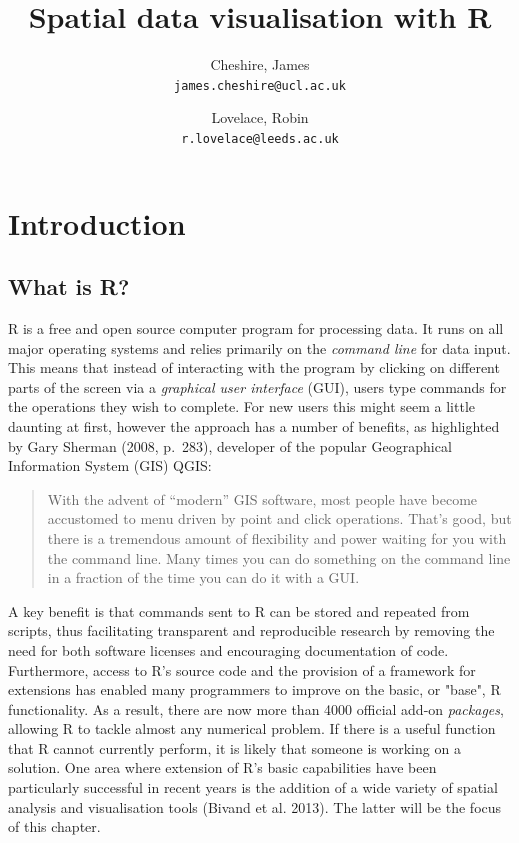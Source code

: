 \documentclass[]{article}
\begin{document}
\author{
Cheshire, James\\
\texttt{james.cheshire@ucl.ac.uk}
\and
Lovelace, Robin\\
\texttt{r.lovelace@leeds.ac.uk}
}
\title{Spatial data visualisation with R}

\maketitle
\section{Introduction}

\subsection{What is R?}

R is a free and open source computer program for
processing data. It runs on all major operating systems and
relies primarily on the \emph{command line} for
data input. This means that instead of interacting with the program by
clicking on different parts of the screen via a \emph{graphical user
interface} (GUI), users type commands for the operations they wish to
complete. For new users this might seem a little daunting at first, however the approach has a
number of benefits, as highlighted by Gary Sherman (2008, p.~283),
developer of the popular Geographical Information System (GIS) QGIS:

\begin{quote}
With the advent of ``modern'' GIS software, most people have become accustomed to menu driven by point and click operations. That's good, but there is a tremendous
amount of flexibility and power waiting for you with the command line.
Many times you can do something on the command line in a fraction of the
time you can do it with a GUI.
\end{quote}

A key benefit is that commands sent to R
can be stored and repeated from scripts, thus facilitating transparent and reproducible research by
removing the need for both software licenses and encouraging
documentation of code. Furthermore, access to R's source code and the provision of a framework for extensions
has enabled many programmers to improve on the basic, or "base", R functionality. As a result, there are now more
than 4000 official add-on \emph{packages}, allowing R to tackle
almost any numerical problem. If there is a useful function that R
cannot currently perform, it is likely that someone is working
on a solution. One area where
extension of R's basic capabilities have been particularly successful in
recent years is the addition of a wide variety of spatial analysis and
visualisation tools (Bivand et al. 2013). The latter will be the focus
of this chapter.
\end{document}
